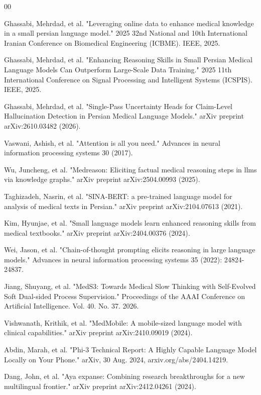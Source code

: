 \documentclass[review]{elsarticle}
\begin{document}
\begin{thebibliography}{00}

Ghassabi, Mehrdad, et al. "Leveraging online data to enhance medical knowledge in a small persian language model." 2025 32nd National and 10th International Iranian Conference on Biomedical Engineering (ICBME). IEEE, 2025.

Ghassabi, Mehrdad, et al. "Enhancing Reasoning Skills in Small Persian Medical Language Models Can Outperform Large-Scale Data Training." 2025 11th International Conference on Signal Processing and Intelligent Systems (ICSPIS). IEEE, 2025.

Ghassabi, Mehrdad, et al. "Single-Pass Uncertainty Heads for Claim-Level Hallucination Detection in Persian Medical Language Models." arXiv preprint arXiv:2610.03482 (2026).

Vaswani, Ashish, et al. "Attention is all you need." Advances in neural information processing systems 30 (2017).

Wu, Juncheng, et al. "Medreason: Eliciting factual medical reasoning steps in llms via knowledge graphs." arXiv preprint arXiv:2504.00993 (2025).

Taghizadeh, Nasrin, et al. "SINA-BERT: a pre-trained language model for analysis of medical texts in Persian." arXiv preprint arXiv:2104.07613 (2021).

Kim, Hyunjae, et al. "Small language models learn enhanced reasoning skills from medical textbooks." arXiv preprint arXiv:2404.00376 (2024).

Wei, Jason, et al. "Chain-of-thought prompting elicits reasoning in large language models." Advances in neural information processing systems 35 (2022): 24824-24837.

Jiang, Shuyang, et al. "MedS3: Towards Medical Slow Thinking with Self-Evolved Soft Dual-sided Process Supervision." Proceedings of the AAAI Conference on Artificial Intelligence. Vol. 40. No. 37. 2026.

Vishwanath, Krithik, et al. "MedMobile: A mobile-sized language model with clinical capabilities." arXiv preprint arXiv:2410.09019 (2024).

Abdin, Marah, et al. "Phi-3 Technical Report: A Highly Capable Language Model Locally on Your Phone." arXiv, 30 Aug. 2024, arxiv.org/abs/2404.14219.

Dang, John, et al. "Aya expanse: Combining research breakthroughs for a new multilingual frontier." arXiv preprint arXiv:2412.04261 (2024).


\end{thebibliography}
\end{document}
